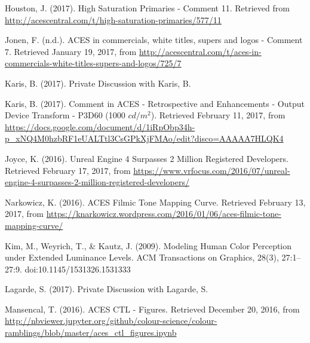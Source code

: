 \documentclass[conference]{IEEEtran}
\begin{document}
\begin{thebibliography}{1}
\renewcommand\@biblabel[1]{[Hou17]}
\bibitem{}
Houston, J. (2017). High Saturation Primaries - Comment 11. Retrieved from \url{http://acescentral.com/t/high-saturation-primaries/577/11} \vspace{2mm}

\renewcommand\@biblabel[1]{[Jon17]}
\bibitem{}
Jonen, F. (n.d.). ACES in commercials, white titles, supers and logos - Comment 7. Retrieved January 19, 2017, from \url{http://acescentral.com/t/aces-in-commercials-white-titles-supers-and-logos/725/7} \vspace{2mm}

\renewcommand\@biblabel[1]{[KaA17]}
\bibitem{}
Karis, B. (2017). Private Discussion with Karis, B. \vspace{2mm}

\renewcommand\@biblabel[1]{[KaB17]}
\bibitem{}
Karis, B. (2017). Comment in ACES - Retrospective and Enhancements - Output Device Transform - P3D60 (1000 $cd/m^2$). Retrieved February 11, 2017, from \url{https://docs.google.com/document/d/1iRpObp34h-p_xNQ4M0hzbRF1eUALTtl3CsGPkXjFMAo/edit?disco=AAAAA7HLQK4} \vspace{2mm}

\renewcommand\@biblabel[1]{[Kev16]}
\bibitem{}
Joyce, K. (2016). Unreal Engine 4 Surpasses 2 Million Registered Developers. Retrieved February 17, 2017, from \url{https://www.vrfocus.com/2016/07/unreal-engine-4-surpasses-2-million-registered-developers/} \vspace{2mm}

\renewcommand\@biblabel[1]{[Nar16]}
\bibitem{}
Narkowicz, K. (2016). ACES Filmic Tone Mapping Curve. Retrieved February 13, 2017, from \url{https://knarkowicz.wordpress.com/2016/01/06/aces-filmic-tone-mapping-curve/} \vspace{2mm}

\renewcommand\@biblabel[1]{[KWK09]}
\bibitem{}
Kim, M., Weyrich, T., \& Kautz, J. (2009). Modeling Human Color Perception under Extended Luminance Levels. ACM Transactions on Graphics, 28(3), 27:1--27:9. doi:10.1145/1531326.1531333 \vspace{2mm}

\renewcommand\@biblabel[1]{[Lag17}
\bibitem{}
Lagarde, S. (2017). Private Discussion with Lagarde, S. \vspace{2mm}

\renewcommand\@biblabel[1]{[MaA16]}
\bibitem{}
Mansencal, T. (2016). ACES CTL - Figures. Retrieved December 20, 2016, from \url{http://nbviewer.jupyter.org/github/colour-science/colour-ramblings/blob/master/aces_ctl_figures.ipynb} \vspace{2mm}


\end{thebibliography}
\end{document}
